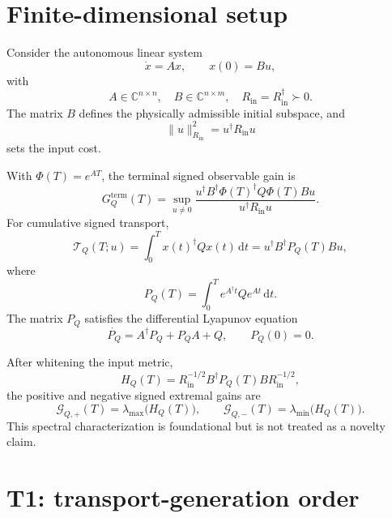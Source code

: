 \documentclass[11pt,a4paper]{article}
\newcommand{\C}{\mathbb{C}}
\newcommand{\dd}{\mathrm{d}}
\newcommand{\la}{\lambda_{\max}}
\newcommand{\li}{\lambda_{\min}}
\newcommand{\PQ}{P_Q}
\newcommand{\HQ}{H_Q}
\begin{document}
\section{Finite-dimensional setup}

Consider the autonomous linear system
\begin{equation}
  \dot{x}=Ax,\qquad x(0)=Bu,
  \label{eq:system}
\end{equation}
with
\begin{equation}
  A\in\C^{n\times n},\quad
  B\in\C^{n\times m},\quad
  R_{\mathrm{in}}=R_{\mathrm{in}}^\dagger\succ0.
\end{equation}
The matrix $B$ defines the physically admissible initial subspace, and
\begin{equation}
  \|u\|_{R_{\mathrm{in}}}^2=u^\dagger R_{\mathrm{in}}u
\end{equation}
sets the input cost.

With $\Phi(T)=e^{AT}$, the terminal signed observable gain is
\begin{equation}
  G_Q^{\mathrm{term}}(T)
  =\sup_{u\neq0}
  \frac{u^\dagger B^\dagger\Phi(T)^\dagger Q\Phi(T)Bu}
       {u^\dagger R_{\mathrm{in}}u}.
\end{equation}
For cumulative signed transport,
\begin{equation}
  \mathcal{T}_Q(T;u)
  =\int_0^T x(t)^\dagger Qx(t)\,\dd t
  =u^\dagger B^\dagger \PQ(T)Bu,
\end{equation}
where
\begin{equation}
  \PQ(T)=\int_0^T e^{A^\dagger t}Qe^{At}\,\dd t.
  \label{eq:PQ}
\end{equation}
The matrix $\PQ$ satisfies the differential Lyapunov equation
\begin{equation}
  \dot{\PQ}=A^\dagger\PQ+\PQ A+Q,
  \qquad \PQ(0)=0.
\end{equation}

After whitening the input metric,
\begin{equation}
  \HQ(T)
  =R_{\mathrm{in}}^{-1/2}B^\dagger\PQ(T)B R_{\mathrm{in}}^{-1/2},
\end{equation}
the positive and negative signed extremal gains are
\begin{equation}
  \mathcal{G}_{Q,+}(T)=\la\bigl(\HQ(T)\bigr),
  \qquad
  \mathcal{G}_{Q,-}(T)=\li\bigl(\HQ(T)\bigr).
  \label{eq:signedgains}
\end{equation}
This spectral characterization is foundational but is not treated as a novelty claim.

\section{T1: transport-generation order}
\end{document}
